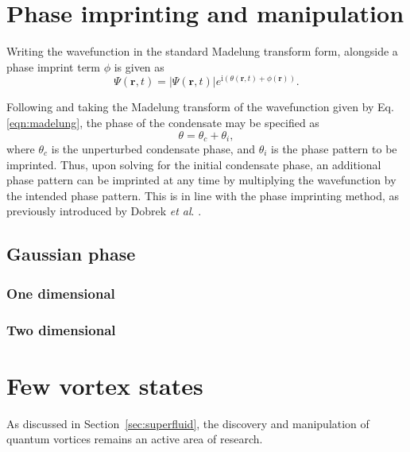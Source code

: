 \section{Phase imprinting and manipulation}
Writing the wavefunction in the standard Madelung transform form, alongside a phase imprint term $\phi$ is given as
\begin{equation}
    \Psi(\mathbf{r},t) = |\Psi(\mathbf{r},t)|e^{\text{i}(\theta(\mathbf{r},t) + \phi(\mathbf{r}))}.
\end{equation}


Following \cite{BK:Pitaevskii_Stringari_2003} and taking the Madelung transform of the wavefunction given by Eq. \eqref{eqn:madelung}, the phase of the condensate may be specified as
\begin{equation}
\theta = \theta_c + \theta_i,
\end{equation}
where $\theta_c$ is the unperturbed condensate phase, and $\theta_i$ is the phase pattern to be imprinted. Thus, upon solving for the initial condensate phase, an additional phase pattern can be imprinted at any time by multiplying the wavefunction by the intended phase pattern. This is in line with the phase imprinting method, as previously introduced by Dobrek \textit{et al}. \cite{Vtx:Dobrek_pra_1999}.



\subsection{Gaussian phase}

\subsubsection{One dimensional}

\subsubsection{Two dimensional}



\section{Few vortex states}
As discussed in Section~\ref{sec:superfluid}, the discovery and manipulation of quantum vortices remains an active area of research.







